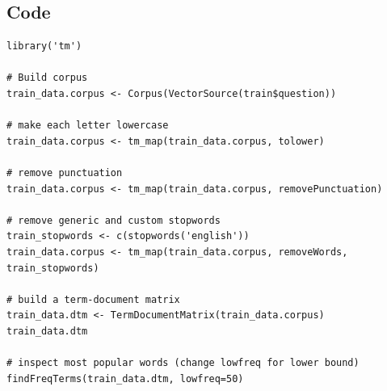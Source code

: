 \documentclass[12pt, oneside]{article}
\begin{document}
\subsection{Code}
\begin{lstlisting}
library('tm')

# Build corpus
train_data.corpus <- Corpus(VectorSource(train$question))

# make each letter lowercase
train_data.corpus <- tm_map(train_data.corpus, tolower)

# remove punctuation 
train_data.corpus <- tm_map(train_data.corpus, removePunctuation)

# remove generic and custom stopwords
train_stopwords <- c(stopwords('english'))
train_data.corpus <- tm_map(train_data.corpus, removeWords, train_stopwords)

# build a term-document matrix
train_data.dtm <- TermDocumentMatrix(train_data.corpus)
train_data.dtm

# inspect most popular words (change lowfreq for lower bound)
findFreqTerms(train_data.dtm, lowfreq=50)
\end{lstlisting}
\end{document}
